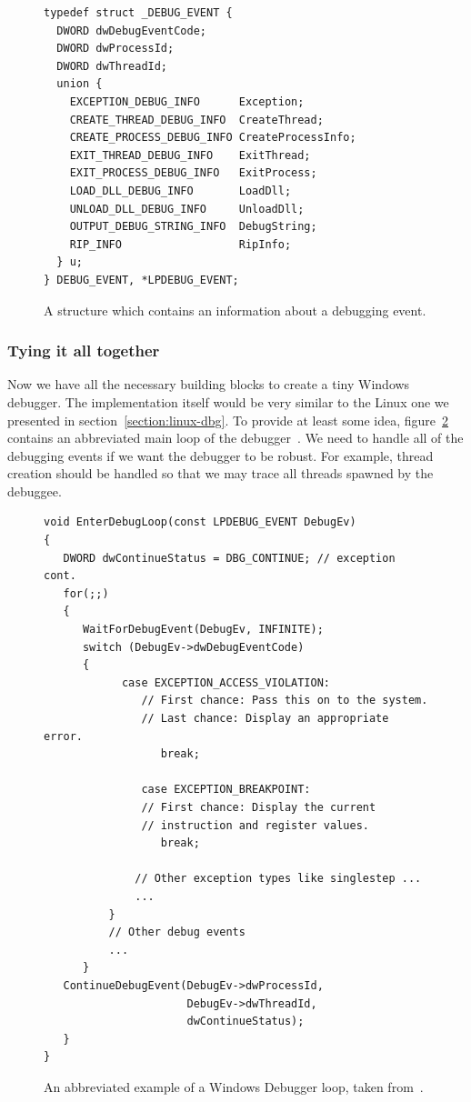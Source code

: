 \begin{figure}
\begin{verbatim}
typedef struct _DEBUG_EVENT {
  DWORD dwDebugEventCode;
  DWORD dwProcessId;
  DWORD dwThreadId;
  union {
    EXCEPTION_DEBUG_INFO      Exception;
    CREATE_THREAD_DEBUG_INFO  CreateThread;
    CREATE_PROCESS_DEBUG_INFO CreateProcessInfo;
    EXIT_THREAD_DEBUG_INFO    ExitThread;
    EXIT_PROCESS_DEBUG_INFO   ExitProcess;
    LOAD_DLL_DEBUG_INFO       LoadDll;
    UNLOAD_DLL_DEBUG_INFO     UnloadDll;
    OUTPUT_DEBUG_STRING_INFO  DebugString;
    RIP_INFO                  RipInfo;
  } u;
} DEBUG_EVENT, *LPDEBUG_EVENT;
\end{verbatim}
\caption{A structure which contains an information about a debugging event.}
\label{fig:DebugEvent}
\end{figure}

\subsubsection*{Tying it all together}
Now we have all the necessary building blocks to create a tiny Windows
debugger. The implementation itself would be very similar to the Linux one we
presented in section~\ref{section:linux-dbg}. To provide at least some idea,
figure~\ref{fig:windows-debugger-mainloop} contains an abbreviated main loop of
the debugger~\cite{windows-msdn-dbg-main-loop}. We need to handle all of the
debugging events if we want the debugger to be robust. For example, thread
creation should be handled so that we may trace all threads spawned by the
debuggee.

\begin{figure}
    \begin{verbatim}
void EnterDebugLoop(const LPDEBUG_EVENT DebugEv)
{
   DWORD dwContinueStatus = DBG_CONTINUE; // exception cont.
   for(;;)
   {
      WaitForDebugEvent(DebugEv, INFINITE);
      switch (DebugEv->dwDebugEventCode)
      {
            case EXCEPTION_ACCESS_VIOLATION: 
               // First chance: Pass this on to the system.
               // Last chance: Display an appropriate error.
                  break;

               case EXCEPTION_BREAKPOINT:
               // First chance: Display the current
               // instruction and register values.
                  break;

              // Other exception types like singlestep ...
              ...
          }
          // Other debug events
          ...
      }
   ContinueDebugEvent(DebugEv->dwProcessId,
                      DebugEv->dwThreadId,
                      dwContinueStatus);
   }
}
    \end{verbatim}
    \caption{An abbreviated example of a Windows Debugger loop, taken
    from~\cite{windows-msdn-dbg-main-loop}.}
    \label{fig:windows-debugger-mainloop}
\end{figure}

